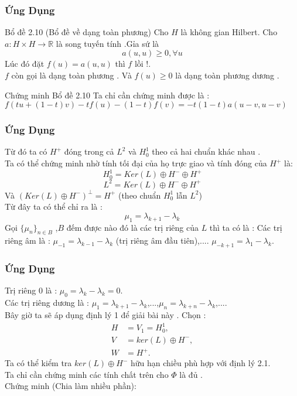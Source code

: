 \documentclass[11pt]{beamer}
\numberwithin{equation}{section}
\theoremstyle{plain}
\theoremstyle{definition}
\theoremstyle{remark}
\begin{document}
\begin{frame}
\frametitle{Ứng Dụng}
\begin{block}{Bổ đề 2.10 (Bổ đề về dạng toàn phương)}
Cho $H$ là không gian Hilbert. Cho $a:H\times H\rightarrow \mathbb{R}$ là song tuyến tính .Gỉa sứ là $$a(u,u)\geq 0,\forall u $$
Lúc đó đặt $f(u)=a(u,u)$ thì $f$ lồi !.\\
$f$ còn gọi là dạng toàn phương . Và $f(u)\geq 0 $ là dạng toàn phương dương .
\end{block}
\begin{block}{Chứng minh Bổ đề 2.10}
Ta chỉ cần chứng minh được là :
$f(tu+(1-t)v)-tf(u)-(1-t)f(v)=-t(1-t)a(u-v,u-v)$
\end{block}
\end{frame}



\begin{frame}
\frametitle{Ứng Dụng}
\noindent Từ đó ta có $H^+$ đóng trong cả $L^2$ và $H^1_0$ theo cả hai chuẩn khác nhau .\\
Ta có thể chứng minh nhờ tính tối đại của họ trực giao và tính đóng của $H^+$ là: $$H^1_0=Ker(L)\oplus H^{-}\oplus H^{+}$$
$$L^2=Ker(L)\oplus H^{-}\oplus H^{+}$$
Và $(Ker(L)\oplus H^{-})^{\perp}=H^{+}$ (theo chuẩn $H^1_0$ lẫn $L^2$)\\
Từ đây ta có thể chỉ ra là :$$\mu_1=\lambda_{k+1}-\lambda_{k}$$
Gọi $\{ \mu_n \}_{n\in B}$ ,$B$ đếm được nào đó là các trị riêng của $L$ thì ta có là :
Các trị riêng âm là : $\mu_{-1}=\lambda_{k-1}-\lambda_k$ (trị riêng âm đầu tiên),.... $\mu_{-k+1}=\lambda_{1}-\lambda_{k}$.\\

\end{frame}

\begin{frame}
\frametitle{Ứng Dụng}
Trị riêng 0 là : $\mu_0=\lambda_k-\lambda_k=0$.\\ 
Các trị riêng dương là : $\mu_{1}=\lambda_{k+1}-\lambda_k$,...,$\mu_{n}=\lambda_{k+n}-\lambda_k$,....\\
Bây giờ ta sẽ áp dụng định lý 1 để giải bài này .
\noindent  Chọn :
\begin{align*}
H&=V_1=H_{0}^1,\\
V&=ker(L)\oplus H^{-},\\
W&=H^{+}.
\end{align*}
Ta có thể kiểm tra $ker(L)\oplus H^{-}$ hữu hạn chiều phù hợp với định lý 2.1.\\
Ta chỉ cần chứng minh các tính chất trên cho $\Phi$ là đủ .\\
Chứng minh (Chia làm nhiều phần):\\
\end{frame}
\end{document}
